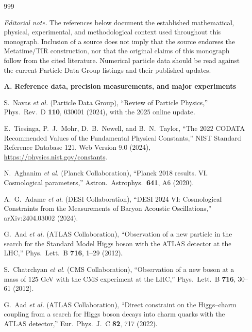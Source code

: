 \documentclass[11pt,a4paper,twoside]{book}
\theoremstyle{definition}
\begin{document}
\renewcommand{\bibname}{Bibliography and Source Map}
\begin{thebibliography}{999}
\small
\sloppy

\item[]\textit{Editorial note.} The references below document the established
mathematical, physical, experimental, and methodological context used throughout
this monograph. Inclusion of a source does not imply that the source endorses the
Metatime/TIR construction, nor that the original claims of this monograph follow
from the cited literature. Numerical particle data should be read against the
current Particle Data Group listings and their published updates.

\item[]\textbf{A. Reference data, precision measurements, and major experiments}

S.~Navas \emph{et al.} (Particle Data Group),
``Review of Particle Physics,''
Phys.\ Rev.\ D \textbf{110}, 030001 (2024), with the 2025 online update.

E.~Tiesinga, P.~J.~Mohr, D.~B.~Newell, and B.~N.~Taylor,
``The 2022 CODATA Recommended Values of the Fundamental Physical Constants,''
NIST Standard Reference Database 121, Web Version 9.0 (2024),
\url{https://physics.nist.gov/constants}.

N.~Aghanim \emph{et al.} (Planck Collaboration),
``Planck 2018 results. VI. Cosmological parameters,''
Astron.\ Astrophys.\ \textbf{641}, A6 (2020).

A.~G.~Adame \emph{et al.} (DESI Collaboration),
``DESI 2024 VI: Cosmological Constraints from the Measurements of Baryon
Acoustic Oscillations,'' arXiv:2404.03002 (2024).

G.~Aad \emph{et al.} (ATLAS Collaboration),
``Observation of a new particle in the search for the Standard Model Higgs
boson with the ATLAS detector at the LHC,''
Phys.\ Lett.\ B \textbf{716}, 1--29 (2012).

S.~Chatrchyan \emph{et al.} (CMS Collaboration),
``Observation of a new boson at a mass of 125 GeV with the CMS experiment at
the LHC,'' Phys.\ Lett.\ B \textbf{716}, 30--61 (2012).

G.~Aad \emph{et al.} (ATLAS Collaboration),
``Direct constraint on the Higgs--charm coupling from a search for Higgs boson
decays into charm quarks with the ATLAS detector,''
Eur.\ Phys.\ J.\ C \textbf{82}, 717 (2022).


\end{thebibliography}
\end{document}
